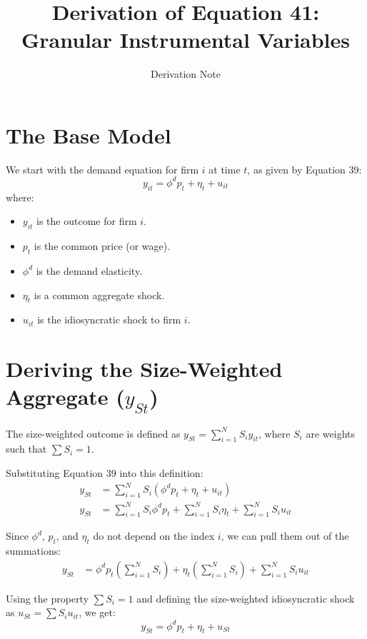 \documentclass[11pt]{article}
\title{Derivation of Equation 41: Granular Instrumental Variables}
\author{Derivation Note}
\date{}
\begin{document}
\maketitle

\section{The Base Model}
We start with the demand equation for firm $i$ at time $t$, as given by Equation 39:
\begin{equation}
y_{it} = \phi^d p_t + \eta_t + u_{it} \tag{39}
\end{equation}
where:
\begin{itemize}
    \item $y_{it}$ is the outcome for firm $i$.
    \item $p_t$ is the common price (or wage).
    \item $\phi^d$ is the demand elasticity.
    \item $\eta_t$ is a common aggregate shock.
    \item $u_{it}$ is the idiosyncratic shock to firm $i$.
\end{itemize}

\section{Deriving the Size-Weighted Aggregate ($y_{St}$)}
The size-weighted outcome is defined as $y_{St} = \sum_{i=1}^N S_i y_{it}$, where $S_i$ are weights such that $\sum S_i = 1$. 

Substituting Equation 39 into this definition:
\begin{align*}
y_{St} &= \sum_{i=1}^N S_i (\phi^d p_t + \eta_t + u_{it}) \\
y_{St} &= \sum_{i=1}^N S_i \phi^d p_t + \sum_{i=1}^N S_i \eta_t + \sum_{i=1}^N S_i u_{it}
\end{align*}

Since $\phi^d$, $p_t$, and $\eta_t$ do not depend on the index $i$, we can pull them out of the summations:
\begin{align*}
y_{St} &= \phi^d p_t \left( \sum_{i=1}^N S_i \right) + \eta_t \left( \sum_{i=1}^N S_i \right) + \sum_{i=1}^N S_i u_{it}
\end{align*}

Using the property $\sum S_i = 1$ and defining the size-weighted idiosyncratic shock as $u_{St} = \sum S_i u_{it}$, we get:
\begin{equation}
y_{St} = \phi^d p_t + \eta_t + u_{St}
\end{equation}
\end{document}
